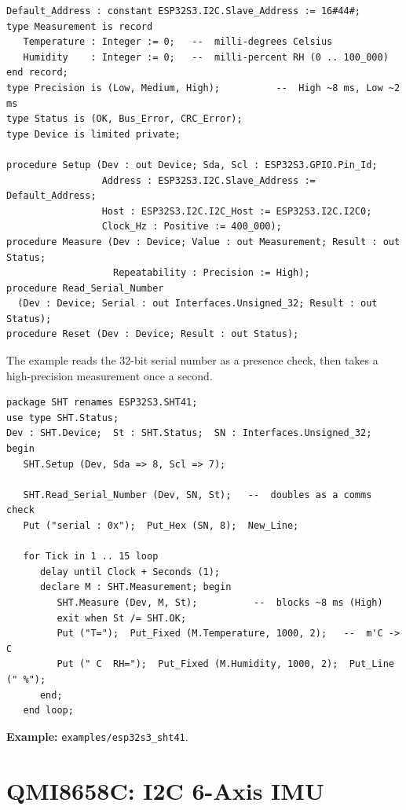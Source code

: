 \begin{lstlisting}
Default_Address : constant ESP32S3.I2C.Slave_Address := 16#44#;
type Measurement is record
   Temperature : Integer := 0;   --  milli-degrees Celsius
   Humidity    : Integer := 0;   --  milli-percent RH (0 .. 100_000)
end record;
type Precision is (Low, Medium, High);          --  High ~8 ms, Low ~2 ms
type Status is (OK, Bus_Error, CRC_Error);
type Device is limited private;

procedure Setup (Dev : out Device; Sda, Scl : ESP32S3.GPIO.Pin_Id;
                 Address : ESP32S3.I2C.Slave_Address := Default_Address;
                 Host : ESP32S3.I2C.I2C_Host := ESP32S3.I2C.I2C0;
                 Clock_Hz : Positive := 400_000);
procedure Measure (Dev : Device; Value : out Measurement; Result : out Status;
                   Repeatability : Precision := High);
procedure Read_Serial_Number
  (Dev : Device; Serial : out Interfaces.Unsigned_32; Result : out Status);
procedure Reset (Dev : Device; Result : out Status);
\end{lstlisting}

The example reads the 32-bit serial number as a presence check, then takes a
high-precision measurement once a second.

\begin{lstlisting}
package SHT renames ESP32S3.SHT41;
use type SHT.Status;
Dev : SHT.Device;  St : SHT.Status;  SN : Interfaces.Unsigned_32;
begin
   SHT.Setup (Dev, Sda => 8, Scl => 7);

   SHT.Read_Serial_Number (Dev, SN, St);   --  doubles as a comms check
   Put ("serial : 0x");  Put_Hex (SN, 8);  New_Line;

   for Tick in 1 .. 15 loop
      delay until Clock + Seconds (1);
      declare M : SHT.Measurement; begin
         SHT.Measure (Dev, M, St);          --  blocks ~8 ms (High)
         exit when St /= SHT.OK;
         Put ("T=");  Put_Fixed (M.Temperature, 1000, 2);   --  m'C -> C
         Put (" C  RH=");  Put_Fixed (M.Humidity, 1000, 2);  Put_Line (" %");
      end;
   end loop;
\end{lstlisting}


\noindent\textbf{Example:} \texttt{examples/esp32s3\_sht41}.

\section{QMI8658C: I2C 6-Axis IMU}
\label{app:ext:qmi8658c}

